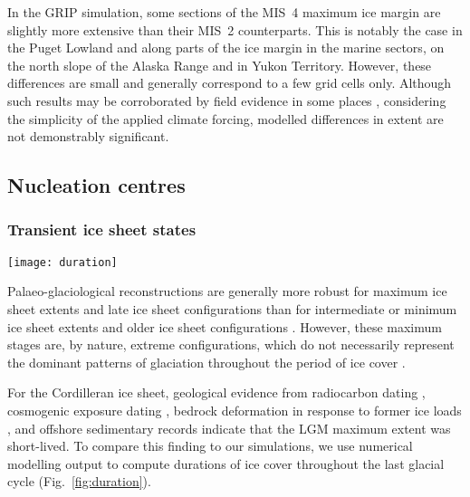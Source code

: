 \documentclass[tc]{copernicus}
\begin{document}
In the GRIP simulation, some sections of the MIS~4 maximum ice margin are
slightly more extensive than their MIS~2 counterparts. This is notably the case
in the Puget Lowland and along parts of the ice margin in the marine sectors,
on the north slope of the Alaska Range and in Yukon Territory. However, these
differences
are small and generally correspond to a few grid cells only. Although such
results may be corroborated by field evidence in some places
\citep[e.g.][]{Ward.etal.2007}, considering the simplicity of the applied
climate forcing, modelled differences in extent are not demonstrably
significant.


\subsection{Nucleation centres}

\subsubsection{Transient ice sheet states}

\begin{figure*}
  \texttt{[image: duration]}
  \caption{Modelled duration of ice cover during the last 120\,ka.
           Note the irregular colour scale. A continuous ice cover spanning
           from the Alaska Range (AR) to the southern Coast Mountains (CM) and
           the Columbia and Rocky mountains (RM) exists for about 29\,ka in
           both simulations. The maximal extent of the ice sheet generally
           corresponds to relatively short durations of ice cover, but ice
           cover persists over the Skeena Mountains (SM) during most of the
           simulation.}
  \label{fig:duration}
\end{figure*}

Palaeo-glaciological reconstructions are generally more robust
for maximum ice sheet extents and late ice sheet configurations than for
intermediate or minimum ice sheet extents and older ice sheet configurations
\citep{Kleman.etal.2010}. However,
these maximum stages are, by nature, extreme configurations, which do not
necessarily represent the dominant patterns of glaciation throughout the period
of ice cover \citep{Porter.1989, Kleman.Stroeven.1997}.

For the Cordilleran ice sheet, geological evidence from radiocarbon dating
    \citep{Clague.etal.1980, Clague.1985, Clague.1986, Porter.Swanson.1998,
           Menounos.etal.2008},
cosmogenic exposure dating
    \citep{Stroeven.etal.2010, Stroeven.etal.2014, Margold.etal.2014},
bedrock deformation in response to former ice loads
    \citep{Clague.James.2002, Clague.etal.2005},
and offshore sedimentary records
    \citep{Cosma.etal.2008, Davies.etal.2011}
indicate that the LGM maximum extent was short-lived. To compare this finding
to our simulations, we use numerical modelling output
to compute durations of ice cover throughout the last glacial
cycle (Fig.~\ref{fig:duration}).
\end{document}
